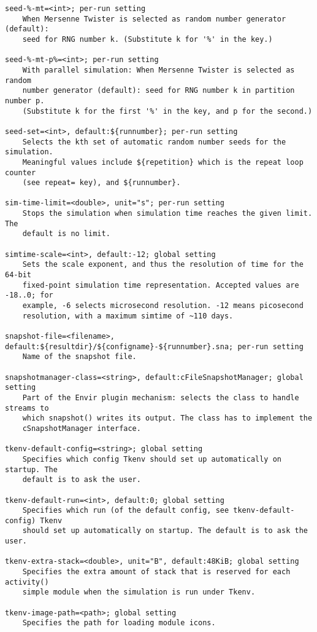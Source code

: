\begin{verbatim}
seed-%-mt=<int>; per-run setting
    When Mersenne Twister is selected as random number generator (default):
    seed for RNG number k. (Substitute k for '%' in the key.)

seed-%-mt-p%=<int>; per-run setting
    With parallel simulation: When Mersenne Twister is selected as random
    number generator (default): seed for RNG number k in partition number p.
    (Substitute k for the first '%' in the key, and p for the second.)

seed-set=<int>, default:${runnumber}; per-run setting
    Selects the kth set of automatic random number seeds for the simulation.
    Meaningful values include ${repetition} which is the repeat loop counter
    (see repeat= key), and ${runnumber}.

sim-time-limit=<double>, unit="s"; per-run setting
    Stops the simulation when simulation time reaches the given limit. The
    default is no limit.

simtime-scale=<int>, default:-12; global setting
    Sets the scale exponent, and thus the resolution of time for the 64-bit
    fixed-point simulation time representation. Accepted values are -18..0; for
    example, -6 selects microsecond resolution. -12 means picosecond
    resolution, with a maximum simtime of ~110 days.

snapshot-file=<filename>, default:${resultdir}/${configname}-${runnumber}.sna; per-run setting
    Name of the snapshot file.

snapshotmanager-class=<string>, default:cFileSnapshotManager; global setting
    Part of the Envir plugin mechanism: selects the class to handle streams to
    which snapshot() writes its output. The class has to implement the
    cSnapshotManager interface.

tkenv-default-config=<string>; global setting
    Specifies which config Tkenv should set up automatically on startup. The
    default is to ask the user.

tkenv-default-run=<int>, default:0; global setting
    Specifies which run (of the default config, see tkenv-default-config) Tkenv
    should set up automatically on startup. The default is to ask the user.

tkenv-extra-stack=<double>, unit="B", default:48KiB; global setting
    Specifies the extra amount of stack that is reserved for each activity()
    simple module when the simulation is run under Tkenv.

tkenv-image-path=<path>; global setting
    Specifies the path for loading module icons.


\end{verbatim}

